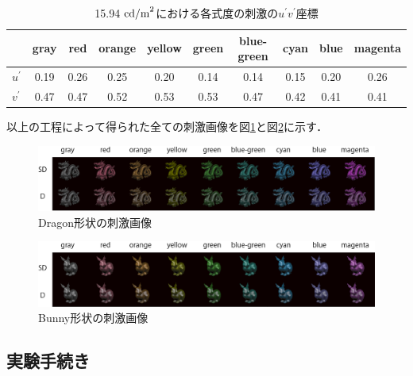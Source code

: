                 \begin{table}[h]
                    \centering
                    \caption{15.94 ${\rm cd/m}^2$における各式度の刺激の$u^{\prime}v^{\prime}$座標}
                    \begin{tabular}{|l||c|c|c|c|c|c|c|c|c|} \hline
                                      & gray   & red    & orange & yellow & green  & blue-green & cyan   & blue   & magenta \\ \hline \hline
                        $u^{\prime}$  & 0.19 & 0.26 & 0.25 & 0.20 & 0.14 & 0.14     & 0.15 & 0.20 & 0.26  \\ \hline
                        $v^{\prime}$  & 0.47 & 0.47 & 0.52 & 0.53 & 0.53 & 0.47     & 0.42 & 0.41 & 0.41  \\ \hline
                    \end{tabular}
                    \label{uvyTable}
                \end{table}

                
            以上の工程によって得られた全ての刺激画像を図\ref{ex1_stimuli_d}と図\ref{ex1_stimuli_b}に示す．

            \begin{figure}[h]
                \centering
                \includegraphics[width=14.0cm]{./img/ex1_stimuli_d_p.png}
                \caption{Dragon形状の刺激画像}
                \label{ex1_stimuli_d}
            \end{figure}

            \begin{figure}[h]
                \centering
                \includegraphics[width=14.0cm]{./img/ex1_stimuli_b_p.png}
                \caption{Bunny形状の刺激画像}
                \label{ex1_stimuli_b}
            \end{figure}

        \subsection{実験手続き}

